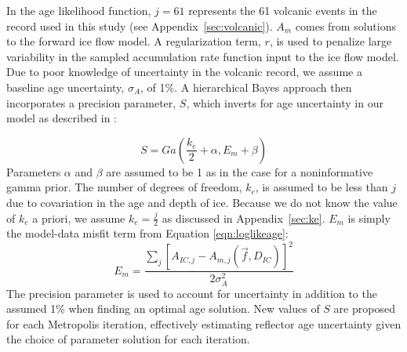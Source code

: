 In the age likelihood function, $j=61$ represents the 61 volcanic events in the record used in this study (see Appendix~\ref{sec:volcanic}). $A_m$ comes from solutions to the forward ice flow model. A regularization term, $r$, is used to penalize large variability in the sampled accumulation rate function input to the ice flow model. Due to poor knowledge of uncertainty in the volcanic record, we assume a baseline age uncertainty, $\sigma_A$, of 1\%.  A hierarchical Bayes approach then incorporates a precision parameter, $S$, which inverts for age uncertainty in our model as described in \citet{jackson&huerta2016}:

\begin{equation}\label{eqn:S}
S = Ga(\frac{k_e}{2}+\alpha, E_m+\beta)
\end{equation}
Parameters $\alpha$ and $\beta$ are assumed to be 1 as in the case for a noninformative gamma prior. The number of degrees of freedom, $k_e$, is assumed to be less than $j$ due to covariation in the age and depth of ice. Because we do not know the value of $k_e$ a priori, we assume $k_e = \frac{j}{2}$ as discussed in Appendix~\ref{sec:ke}. $E_m$ is simply the model-data misfit term from Equation \ref{eqn:loglikeage}:
\begin{equation}
 E_m= \frac{\sum_{j}[A_{IC,j} - A_{m,j}(\vec{f},D_{IC})]^2}{2\sigma_A^2} 
\end{equation}
The precision parameter is used to account for uncertainty in addition to the assumed 1\% when finding an optimal age solution. New values of $S$ are proposed for each Metropolis iteration, effectively estimating reflector age uncertainty given the choice of parameter solution for each iteration.



